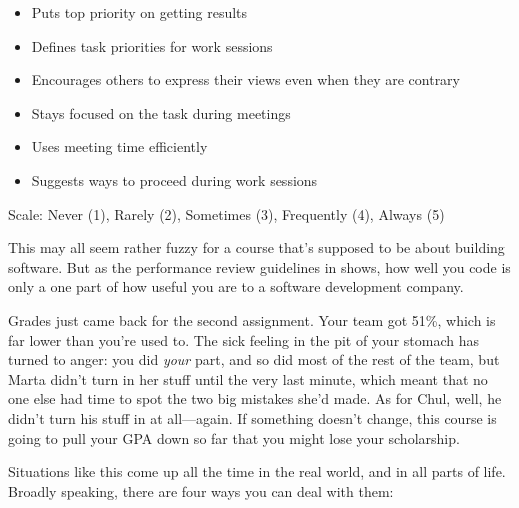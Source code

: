 \documentclass{report}
\begin{document}
\begin{table}
\begin{itemize}
\begin{itemize}
      \item Puts top priority on getting results
      \item Defines task priorities for work sessions
      \item Encourages others to express their views even when they are contrary
      \item Stays focused on the task during meetings
      \item Uses meeting time efficiently
      \item Suggests ways to proceed during work sessions
      \end{itemize}
  \end{itemize}
  Scale: Never (1), Rarely (2), Sometimes (3), Frequently (4), Always (5)
\end{table}

This may all seem rather fuzzy for a course that's supposed to be
about building software.  But as the performance review guidelines in
 shows, how well you code is only a one part of
how useful you are to a software development company.


Grades just came back for the second assignment.  Your team got 51\%,
which is far lower than you're used to.  The sick feeling in the pit
of your stomach has turned to anger: you did \emph{your} part, and so
did most of the rest of the team, but Marta didn't turn in her stuff
until the very last minute, which meant that no one else had time to
spot the two big mistakes she'd made.  As for Chul, well, he didn't
turn his stuff in at all---again.  If something doesn't change, this
course is going to pull your GPA down so far that you might lose your
scholarship.

Situations like this come up all the time in the real world, and in
all parts of life.  Broadly speaking, there are four ways you can deal
with them:
\end{document}
